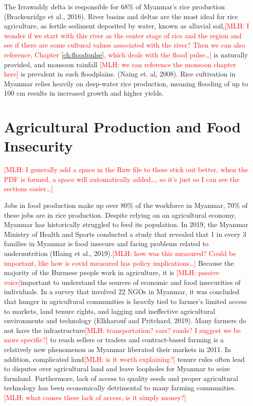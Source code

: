 \documentclass{book}\usepackage{knitr}
\newcommand{\red}[1]{\textcolor{red}{[MLH: #1]}}
\begin{document}
\begin{knitrout}
\begin{kframe}
{The Irrawaddy delta is responsible for 68\% of Myanmar’s rice production (Brackenridge et al., 2016). River basins and deltas are the most ideal for rice agriculture, as fertile sediment deposited by water, known as alluvial soil,\red{I wonder if we start with this river as the center stage of rice and the region and see if there are some cultural values associated with the river?  Then we can also reference, Chapter \ref{ch:floodpulse}, which deals with the flood pulse\ldots} is naturally provided, and monsoon rainfall \red{we can reference the monsoon chapter here} is prevalent in such floodplains. (Naing et. al, 2008). Rice cultivation in Myanmar relies heavily on deep-water rice production, meaning flooding of up to 100 cm results in increased growth and higher yields.
 
\section{Agricultural Production and Food Insecurity}\red{I generally add a space in the Rnw file to these stick out better, when the PDF is formed, a space will automatically added\ldots, so it's just so I can see the sections easier\ldots}

Jobs in food production make up over 80\% of the workforce in Myanmar, 70\% of these jobs are in rice production. Despite relying on an agricultural economy, Myanmar has historically struggled to feed its population. In 2019, the Myanmar Ministry of Health and Sports conducted a study that revealed that 1 in every 3 families in Myanmar is food insecure and facing problems related to undernutrition (Hlaing et al., 2019).\red{how was this measured?  Could be important, like how is covid measured has policy implications\ldots} Because the majority of the Burmese people work in agriculture, it is \red{passive voice}important to understand the sources of economic and food insecurities of individuals. In a survey that involved 22 NGOs in Myanmar, it was concluded that hunger in agricultural communities is heavily tied to farmer’s limited access to markets, land tenure rights, and lagging and ineffective agricultural environments and technology (Elkharouf and Pritchard, 2019). Many farmers do not have the infrastructure\red{transportation? cars? roads? I suggest we  be more specific?} to reach sellers or traders and contract-based farming is a relatively new phenomenon as Myanmar liberated their markets in 2011. In addition, complicated land\red{is it worth explaining?} tenure rules often lead to disputes over agricultural land and leave loopholes for Myanmar to seize farmland. Furthermore, lack of access to quality seeds and proper agricultural technology has been economically detrimental to many farming communities. \red{what causes these lack of access, is it simply money?}

}
\end{kframe}
\end{knitrout}
\end{document}
